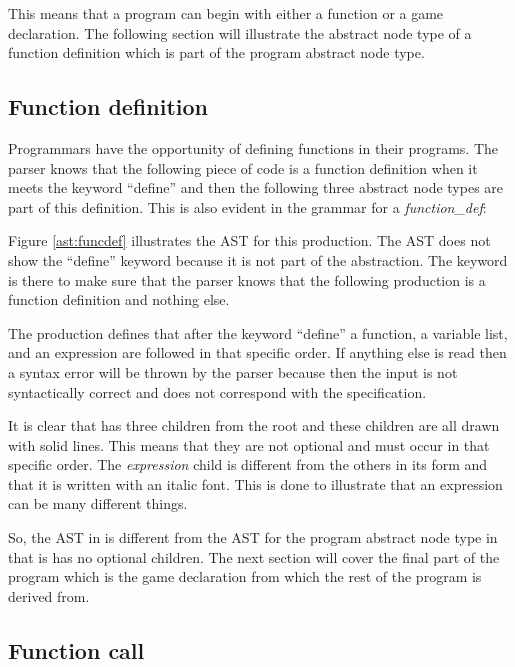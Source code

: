 This means that a program can begin with either a function or a game declaration. The following section will illustrate the abstract node type of a function definition which is part of the program abstract node type.%

\subsection{Function definition}%
Programmars have the opportunity of defining functions in their programs. The parser knows that the following piece of code is a function definition when it meets the keyword ``define'' and then the following three abstract node types are part of this definition. This is also evident in the grammar for a \textit{function\_def}:%

\begin{ebnf}%
%
\end{ebnf}%

%

Figure \ref{ast:funcdef} illustrates the AST for this production. The AST does not show the ``define'' keyword because it is not part of the abstraction. The keyword is there to make sure that the parser knows that the following production is a function definition and nothing else.%

The production defines that after the keyword ``define'' a function, a variable list, and an expression are followed in that specific order. If anything else is read then a syntax error will be thrown by the parser because then the input is not syntactically correct and does not correspond with the specification.%

It is clear that  has three children from the root and these children are all drawn with solid lines. This means that they are not optional and must occur in that specific order. The \textit{expression} child is different from the others in its form and that it is written with an italic font. This is done to illustrate that an expression can be many different things.%

So, the AST in  is different from the AST for the program abstract node type in that is has no optional children. The next section will cover the final part of the program which is the game declaration from which the rest of the program is derived from.%

\subsection{Function call}

